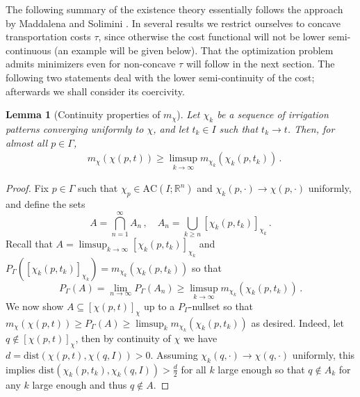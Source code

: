\documentclass[10pt,a4paper,oneside,final]{article}
\newcommand{\R}{{\mathbb{R}}}
\newcommand{\dist}{{\mathrm{dist}}}
\newcommand{\AC}{\mathrm{AC}}
\newcommand{\reSpace}{\Gamma}
\newcommand{\reMeasure}{P_{\reSpace}}
\numberwithin{equation}{section}
\theoremstyle{plain}
\newtheorem{lemma}[theorem]{Lemma}
\theoremstyle{definition}
\theoremstyle{remark}
\begin{document}
The following summary of the existence theory essentially follows the approach by Maddalena and Solimini \cite{Maddalena-Solimini-Transport-Distances,Maddalena-Solimini-Synchronic}.
In several results we restrict ourselves to concave transportation costs $\tau$, since otherwise the cost functional will not be lower semi-continuous (an example will be given below).
That the optimization problem admits minimizers even for non-concave $\tau$ will follow in the next section.
The following two statements deal with the lower semi-continuity of the cost; afterwards we shall consider its coercivity.

\begin{lemma}[Continuity properties of $m_\chi$]\label{prop:mass_is_upper_semi-continuous}
Let $\chi_k$ be a sequence of irrigation patterns converging uniformly to $\chi$, and let $t_k \in I$ such that $t_k \to t$. Then, for almost all $p \in \reSpace$,
\begin{align*}
 &m_\chi(\chi(p,t)) \geq \limsup_{k \to \infty} m_{\chi_k}(\chi_k(p,t_k))\,.\label{eq:mass_is_upper_semi-continuous}%
\end{align*}
\end{lemma}

\begin{proof}
Fix $p \in \reSpace$ such that $\chi_p\in \AC(I;\R^n)$ and $\chi_k(p,\cdot)\to\chi(p,\cdot)$ uniformly, %
and define the sets
\begin{displaymath}
 A = \bigcap_{n=1}^\infty A_n\,, \quad A_n = \bigcup_{k \geq n} [\chi_k(p,t_k)]_{\chi_k}\,.
\end{displaymath}
Recall that $A = \limsup_{k\to\infty} [\chi_k(p,t_k)]_{\chi_k}$ and $\reMeasure([\chi_k(p,t_k)]_{\chi_k}) = m_{\chi_k}(\chi_k(p,t_k))$ so that
\begin{displaymath}
 \reMeasure(A) = \lim_{n\to\infty}\reMeasure(A_n) \geq \limsup_{k\to\infty} m_{\chi_k}(\chi_k(p,t_k))\,.
\end{displaymath}
We now show $A \subseteq [\chi(p,t)]_{\chi}$ up to a $\reMeasure$-nullset so that $m_\chi(\chi(p,t)) \geq \reMeasure(A) \geq \limsup_k m_{\chi_k}(\chi_k(p,t_k))$ as desired.
Indeed, let $q \notin[\chi(p,t)]_{\chi}$, then by continuity of $\chi$ we have $d=\dist(\chi(p,t),\chi(q,I)) > 0$.
Assuming $\chi_k(q,\cdot) \to \chi(q,\cdot)$ uniformly, this implies $\dist(\chi_k(p,t_k),\chi_k(q,I)) > \frac d2$ for all $k$ large enough
so that $q\notin A_k$ for any $k$ large enough and thus $q\notin A$.
\end{proof}
\end{document}
